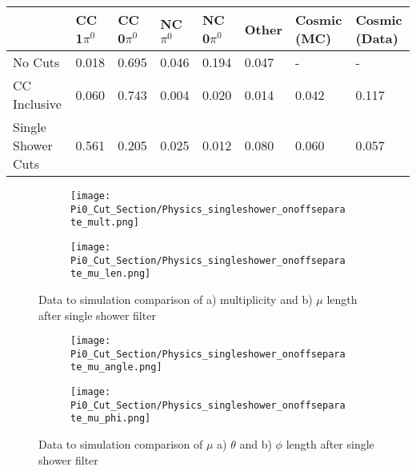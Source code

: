 \begin{table}[H]
\centering
{}
 \begin{tabular}{| l | l | l |l|l|l|l|l|}
 \hline
  & CC 1$\pi^0$ & CC 0$\pi^0$ & NC $\pi^0$ & NC 0$\pi^0$ & Other& Cosmic (MC) & Cosmic (Data) \\ [0.1ex] \hline
No Cuts  & 0.018 &  0.695 & 0.046 & 0.194  & 0.047 & -&-\\
CC Inclusive & 0.060 & 0.743 & 0.004 & 0.020 & 0.014 & 0.042 & 0.117  \\ 
Single Shower Cuts & 0.561 & 0.205 & 0.025 & 0.012 & 0.080 & 0.060 & 0.057 \\ \hline
\end{tabular}
\end{table}

\begin{figure}[H]
\centering
  \begin{subfigure}[t]{0.3\textwidth}
    \centering
\texttt{[image: Pi0\_Cut\_Section/Physics\_singleshower\_onoffseparate\_mult.png]}
  \caption{ }
  \end{subfigure} 
  \hspace{20mm}
  \begin{subfigure}[t]{0.3\textwidth}
    \centering
\texttt{[image: Pi0\_Cut\_Section/Physics\_singleshower\_onoffseparate\_mu\_len.png]}
  \caption{ }
  \end{subfigure} 

\caption{ Data to simulation comparison of a) multiplicity and b) $\mu$ length after single shower filter }
\label{fig:physics_singleshower_mulen}
\end{figure}

\begin{figure}[H]
\centering
  \begin{subfigure}[t]{0.3\textwidth}
    \centering
\texttt{[image: Pi0\_Cut\_Section/Physics\_singleshower\_onoffseparate\_mu\_angle.png]}
  \caption{ }
  \end{subfigure} 
  \hspace{20mm}
  \begin{subfigure}[t]{0.3\textwidth}
    \centering
\texttt{[image: Pi0\_Cut\_Section/Physics\_singleshower\_onoffseparate\_mu\_phi.png]}
  \caption{ }
  \end{subfigure} 
\caption{ Data to simulation comparison of $\mu$ a) $\theta$ and b) $\phi$ length after single shower filter }
\label{fig:physics_singleshower_muphi}
\end{figure}

